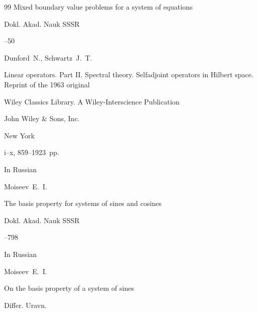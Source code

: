 \begin{thebibliography}{99}
\paper Mixed boundary value problems for a system of equations

\jour Dokl. Akad. Nauk SSSR 




–50








\by Dunford~N., Schwartz~J.~T.

\book Linear operators. Part II. Spectral theory. Selfadjoint operators in Hilbert space. \rm Reprint of the 1963 original

\serial Wiley Classics Library. A Wiley-Interscience Publication

\publ John Wiley \& Sons, Inc.

\publaddr New York


\totalpages i–x, 859–1923~pp. \nofrills










\lang In Russian

\by Moiseev~E.~I.

\paper The basis property for systems of sines and cosines

\jour Dokl. Akad. Nauk SSSR 




--798








\lang In Russian

\by Moiseev~E.~I.

\paper On the basis property of a system of sines

\jour Differ. Uravn.





\end{thebibliography}
